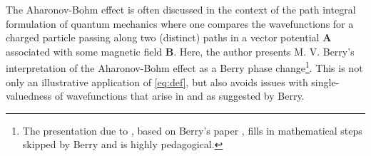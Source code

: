 \documentclass[reprint,
nofootinbib,
amsmath,amssymb,
aps]{revtex4-1}
\begin{document}
The Aharonov-Bohm effect is often discussed in the context of the path integral formulation of quantum mechanics where one compares the wavefunctions for a charged particle passing along two (distinct) paths in a vector potential $\bm{A}$ associated with some magnetic field $\bm{B}$.  Here, the author presents M. V. Berry's interpretation of the Aharonov-Bohm effect as a Berry phase change\footnote{The presentation due to \cite{griffiths2018introduction}, based on Berry's paper \cite{berry1984quantal}, fills in mathematical steps skipped by Berry and is highly pedagogical.}. This is not only an illustrative application of \eqref{eq:def}, but also avoids issues with single-valuedness of wavefunctions that arise in \cite{aharonov1959significance} and \cite{ehrenberg1949refractive} as suggested by Berry. 



\end{document}
